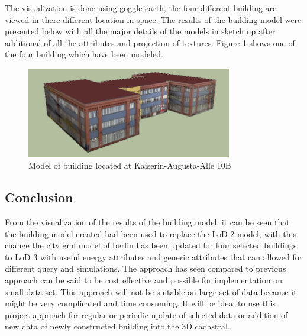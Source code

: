 The visualization is done using goggle earth, the four different building are viewed in there different location in space. 
The results of the building model were presented below with all the major details of the models in sketch up after additional of all the attributes and projection of textures. Figure \ref{fig:kaiserin} shows one of the four building which have been modeled.
\begin{figure}[ht]
	\centering
	\includegraphics[width=0.8\textwidth]{phase1/group2/figures/kaiserin.png}
	\caption{Model of building located at Kaiserin-Augusta-Alle 10B}
	\label{fig:kaiserin}
\end{figure}


\subsection{Conclusion}
From the visualization of the results of the building model, it can be seen that the building model created had been used to replace the LoD 2 model, with this change the city gml model of berlin has been updated for four selected buildings to LoD 3 with useful energy attributes and generic attributes that can allowed for different query and simulations. The approach has seen compared to previous approach can be said to be cost effective and possible for implementation on small data set. This approach will not be suitable on large set of data because it might be very complicated and time consuming. It will be ideal to use this project approach for regular or periodic update of selected data or addition of new data of newly constructed building into the 3D cadastral. 




